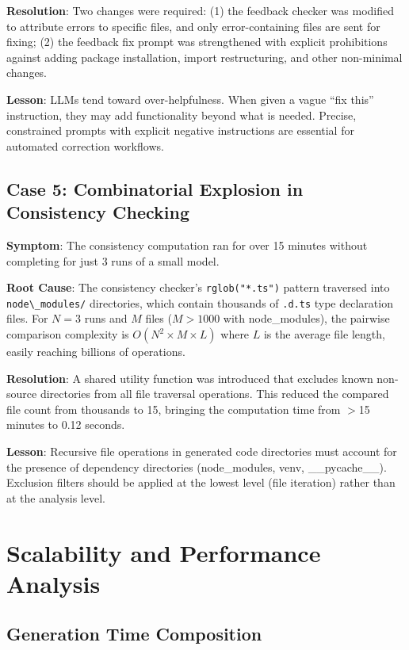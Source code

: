 \documentclass[11pt,a4paper]{article}
\begin{document}
{{\textbf{Resolution}: Two changes were required: (1) the feedback checker was modified to attribute errors to specific files, and only error-containing files are sent for fixing; (2) the feedback fix prompt was strengthened with explicit prohibitions against adding package installation, import restructuring, and other non-minimal changes.

\textbf{Lesson}: LLMs tend toward over-helpfulness. When given a vague ``fix this'' instruction, they may add functionality beyond what is needed. Precise, constrained prompts with explicit negative instructions are essential for automated correction workflows.

\subsection{Case 5: Combinatorial Explosion in Consistency Checking}

\textbf{Symptom}: The consistency computation ran for over 15 minutes without completing for just 3 runs of a small model.

\textbf{Root Cause}: The consistency checker's {\lstinline|rglob("*.ts")|} pattern traversed into {\lstinline|node\_modules/|} directories, which contain thousands of {\lstinline|.d.ts|} type declaration files. For $N=3$ runs and $M$ files ($M > 1000$ with node\_modules), the pairwise comparison complexity is $O(N^2 \times M \times L)$ where $L$ is the average file length, easily reaching billions of operations.

\textbf{Resolution}: A shared utility function was introduced that excludes known non-source directories from all file traversal operations. This reduced the compared file count from thousands to 15, bringing the computation time from $>$15 minutes to 0.12 seconds.

\textbf{Lesson}: Recursive file operations in generated code directories must account for the presence of dependency directories (node\_modules, venv, \_\_pycache\_\_). Exclusion filters should be applied at the lowest level (file iteration) rather than at the analysis level.

\newpage
\section{Scalability and Performance Analysis}
\label{sec:scalability}

\subsection{Generation Time Composition}

}}
\end{document}
